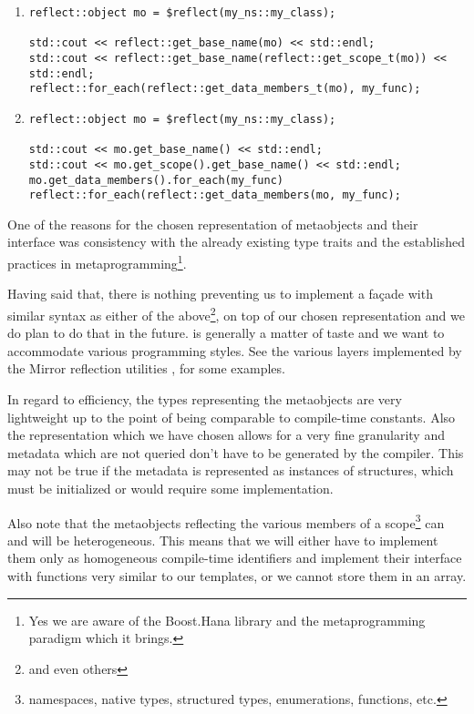 \begin{enumerate}[label=\textbf{\Alph*)}]

\item
\begin{verbatim}
reflect::object mo = $reflect(my_ns::my_class);

std::cout << reflect::get_base_name(mo) << std::endl;
std::cout << reflect::get_base_name(reflect::get_scope_t(mo)) << std::endl;
reflect::for_each(reflect::get_data_members_t(mo), my_func);
\end{verbatim}

\item
\begin{verbatim}
reflect::object mo = $reflect(my_ns::my_class);

std::cout << mo.get_base_name() << std::endl;
std::cout << mo.get_scope().get_base_name() << std::endl;
mo.get_data_members().for_each(my_func)
reflect::for_each(reflect::get_data_members(mo, my_func);
\end{verbatim}

\end{enumerate}

One of the reasons for the chosen representation of metaobjects and their
interface was consistency with the already existing type traits and the
established practices in metaprogramming\footnote{Yes we are aware of the
Boost.Hana library and the metaprogramming paradigm which it brings.}.

Having said that, there is nothing preventing us to implement a fa\c{c}ade
with similar syntax as either of the above\footnote{and even others}, on top
of our chosen representation and we do plan to do that in the future.
 is generally a matter of taste and we want to accommodate
various programming styles. See the various layers implemented by the Mirror
reflection utilities \cite{Chochlik-Mirror-new-doc},
\cite{Chochlik-Mirror-old-doc} for some examples.

In regard to efficiency, the types representing the metaobjects are very
lightweight up to the point of being comparable to compile-time constants.
Also the representation which we have chosen allows for a very fine granularity
and metadata which are not queried don't have to be generated by the compiler.
This may not be true if the metadata is represented as instances of \verb@constexpr@
structures, which must be initialized or would require some 
implementation.

Also note that the metaobjects reflecting the various members of a scope\footnote{
namespaces, native types, structured types, enumerations, functions, etc.}
can and will be heterogeneous. This means that we will either have to implement
them only as homogeneous compile-time identifiers and implement their interface
with  \verb@constexpr@ functions very similar to our templates, or
we cannot store them in an array.

